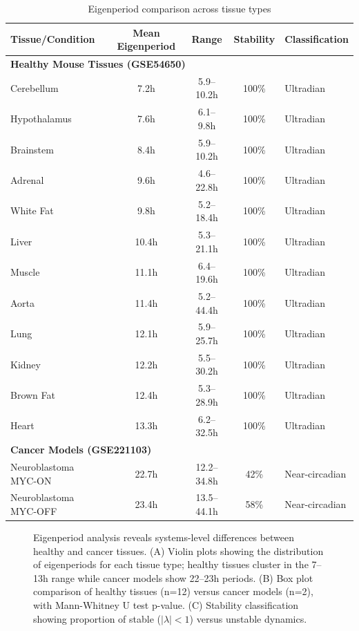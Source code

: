 \documentclass[11pt,a4paper]{article}
\begin{document}
\begin{table}[H]
\centering
\caption{Eigenperiod comparison across tissue types}
\label{tab:eigenperiod}
\begin{tabular}{lcccl}
\toprule
Tissue/Condition & Mean Eigenperiod & Range & Stability & Classification \\
\midrule
\multicolumn{5}{l}{\textbf{Healthy Mouse Tissues (GSE54650)}} \\
Cerebellum & 7.2h & 5.9--10.2h & 100\% & Ultradian \\
Hypothalamus & 7.6h & 6.1--9.8h & 100\% & Ultradian \\
Brainstem & 8.4h & 5.9--10.2h & 100\% & Ultradian \\
Adrenal & 9.6h & 4.6--22.8h & 100\% & Ultradian \\
White Fat & 9.8h & 5.2--18.4h & 100\% & Ultradian \\
Liver & 10.4h & 5.3--21.1h & 100\% & Ultradian \\
Muscle & 11.1h & 6.4--19.6h & 100\% & Ultradian \\
Aorta & 11.4h & 5.2--44.4h & 100\% & Ultradian \\
Lung & 12.1h & 5.9--25.7h & 100\% & Ultradian \\
Kidney & 12.2h & 5.5--30.2h & 100\% & Ultradian \\
Brown Fat & 12.4h & 5.3--28.9h & 100\% & Ultradian \\
Heart & 13.3h & 6.2--32.5h & 100\% & Ultradian \\
\midrule
\multicolumn{5}{l}{\textbf{Cancer Models (GSE221103)}} \\
Neuroblastoma MYC-ON & 22.7h & 12.2--34.8h & 42\% & Near-circadian \\
Neuroblastoma MYC-OFF & 23.4h & 13.5--44.1h & 58\% & Near-circadian \\
\bottomrule
\end{tabular}
\end{table}

\begin{figure}[H]
\centering
{}
\caption{Eigenperiod analysis reveals systems-level differences between healthy and cancer tissues. (A) Violin plots showing the distribution of eigenperiods for each tissue type; healthy tissues cluster in the 7--13h range while cancer models show 22--23h periods. (B) Box plot comparison of healthy tissues (n=12) versus cancer models (n=2), with Mann-Whitney U test p-value. (C) Stability classification showing proportion of stable ($|\lambda| < 1$) versus unstable dynamics.}
\label{fig:eigenperiod}
\end{figure}
\end{document}
